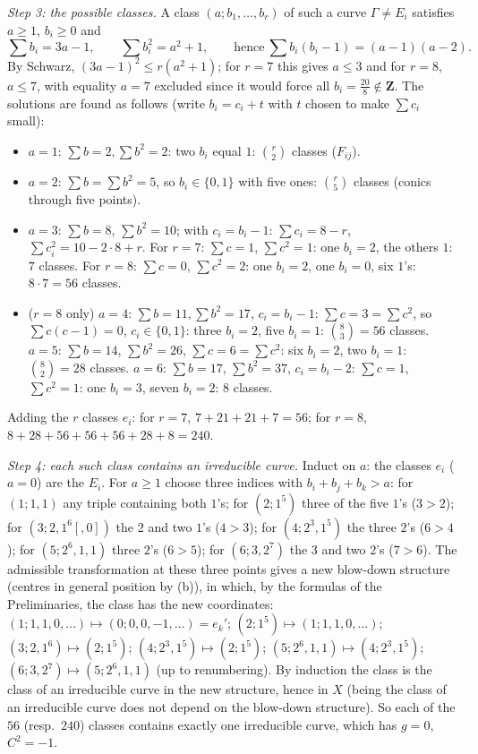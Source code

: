 \documentclass[11pt]{article}
\begin{document}
\emph{Step 3: the possible classes.} A class $(a;b_1,\dots,b_r)$ of such a curve $\Gamma\ne E_i$ satisfies $a\ge1$, $b_i\ge0$ and
\[
\sum b_i=3a-1,\qquad\sum b_i^2=a^2+1,\qquad\text{hence}\ \sum b_i(b_i-1)=(a-1)(a-2).
\]
By Schwarz, $(3a-1)^2\le r(a^2+1)$; for $r=7$ this gives $a\le3$ and for $r=8$, $a\le7$, with equality $a=7$ excluded since it would force all $b_i=\frac{20}8\notin\mathbf Z$. The solutions are found as follows (write $b_i=c_i+t$ with $t$ chosen to make $\sum c_i$ small):
\begin{itemize}
\item $a=1$: $\sum b=2,\sum b^2=2$: two $b_i$ equal $1$: $\binom r2$ classes ($F_{ij}$).
\item $a=2$: $\sum b=\sum b^2=5$, so $b_i\in\{0,1\}$ with five ones: $\binom r5$ classes (conics through five points).
\item $a=3$: $\sum b=8$, $\sum b^2=10$; with $c_i=b_i-1$: $\sum c_i=8-r$, $\sum c_i^2=10-2\cdot 8+r$. For $r=7$: $\sum c=1$, $\sum c^2=1$: one $b_i=2$, the others $1$: $7$ classes. For $r=8$: $\sum c=0$, $\sum c^2=2$: one $b_i=2$, one $b_i=0$, six $1$'s: $8\cdot7=56$ classes.
\item ($r=8$ only) $a=4$: $\sum b=11,\sum b^2=17$, $c_i=b_i-1$: $\sum c=3=\sum c^2$, so $\sum c(c-1)=0$, $c_i\in\{0,1\}$: three $b_i=2$, five $b_i=1$: $\binom83=56$ classes. $a=5$: $\sum b=14$, $\sum b^2=26$, $\sum c=6=\sum c^2$: six $b_i=2$, two $b_i=1$: $\binom82=28$ classes. $a=6$: $\sum b=17$, $\sum b^2=37$, $c_i=b_i-2$: $\sum c=1$, $\sum c^2=1$: one $b_i=3$, seven $b_i=2$: $8$ classes.
\end{itemize}
Adding the $r$ classes $e_i$: for $r=7$, $7+21+21+7=56$; for $r=8$, $8+28+56+56+56+28+8=240$.

\emph{Step 4: each such class contains an irreducible curve.} Induct on $a$: the classes $e_i$ ($a=0$) are the $E_i$. For $a\ge1$ choose three indices with $b_i+b_j+b_k>a$: for $(1;1,1)$ any triple containing both $1$'s; for $(2;1^5)$ three of the five $1$'s ($3>2$); for $(3;2,1^6[,0])$ the $2$ and two $1$'s ($4>3$); for $(4;2^3,1^5)$ the three $2$'s ($6>4$); for $(5;2^6,1,1)$ three $2$'s ($6>5$); for $(6;3,2^7)$ the $3$ and two $2$'s ($7>6$). The admissible transformation at these three points gives a new blow-down structure (centres in general position by (b)), in which, by the formulas of the Preliminaries, the class has the new coordinates: $(1;1,1,0,\dots)\mapsto(0;0,0,-1,\dots)=e_k'$; $(2;1^5)\mapsto(1;1,1,0,\dots)$; $(3;2,1^6)\mapsto(2;1^5)$; $(4;2^3,1^5)\mapsto(2;1^5)$; $(5;2^6,1,1)\mapsto(4;2^3,1^5)$; $(6;3,2^7)\mapsto(5;2^6,1,1)$ (up to renumbering). By induction the class is the class of an irreducible curve in the new structure, hence in $X$ (being the class of an irreducible curve does not depend on the blow-down structure). So each of the $56$ (resp.\ $240$) classes contains exactly one irreducible curve, which has $g=0$, $C^2=-1$.
\end{document}
